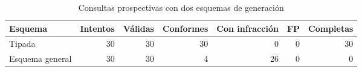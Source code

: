 \begin{table}[!t]
\caption{Consultas prospectivas con dos esquemas de generación}
\label{tab:query_interfaces}\centering\footnotesize
\begin{tabular*}{\textwidth}{@{\extracolsep{\fill}}lrrrrrr}\hline
Esquema & Intentos & Válidas & Conformes & Con infracción & FP & Completas\\\hline
Tipada & 30 & 30 & 30 & 0 & 0 & 30\\
Esquema general & 30 & 30 & 4 & 26 & 0 & 0\\
\hline\end{tabular*}\end{table}
